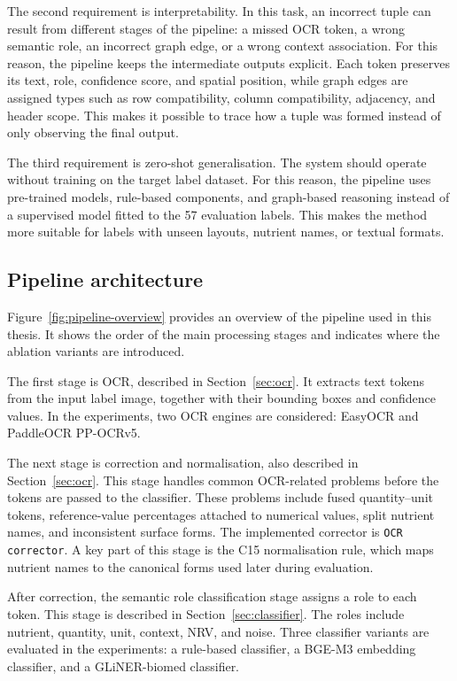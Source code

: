 The second requirement is interpretability. In this task, an incorrect tuple can result from different stages of the pipeline: a missed OCR token, a wrong semantic role, an incorrect graph edge, or a wrong context association. For this reason, the pipeline keeps the intermediate outputs explicit. Each token preserves its text, role, confidence score, and spatial position, while graph edges are assigned types such as row compatibility, column compatibility, adjacency, and header scope. This makes it possible to trace how a tuple was formed instead of only observing the final output.

The third requirement is zero-shot generalisation. The system should operate without training on the target label dataset. For this reason, the pipeline uses pre-trained models, rule-based components, and graph-based reasoning instead of a supervised model fitted to the 57 evaluation labels. This makes the method more suitable for labels with unseen layouts, nutrient names, or textual formats.

\subsection{Pipeline architecture}\label{sec:overview-pipeline}

Figure~\ref{fig:pipeline-overview} provides an overview of the pipeline used in this thesis. It shows the order of the main processing stages and indicates where the ablation variants are introduced.

The first stage is OCR, described in Section~\ref{sec:ocr}. It extracts text tokens from the input label image, together with their bounding boxes and confidence values. In the experiments, two OCR engines are considered: EasyOCR and PaddleOCR PP-OCRv5.

The next stage is correction and normalisation, also described in Section~\ref{sec:ocr}. This stage handles common OCR-related problems before the tokens are passed to the classifier. These problems include fused quantity--unit tokens, reference-value percentages attached to numerical values, split nutrient names, and inconsistent surface forms. The implemented corrector is \texttt{OCR corrector}. A key part of this stage is the C15 normalisation rule, which maps nutrient names to the canonical forms used later during evaluation.

After correction, the semantic role classification stage assigns a role to each token. This stage is described in Section~\ref{sec:classifier}. The roles include nutrient, quantity, unit, context, NRV, and noise. Three classifier variants are evaluated in the experiments: a rule-based classifier, a BGE-M3 embedding classifier, and a GLiNER-biomed classifier.

